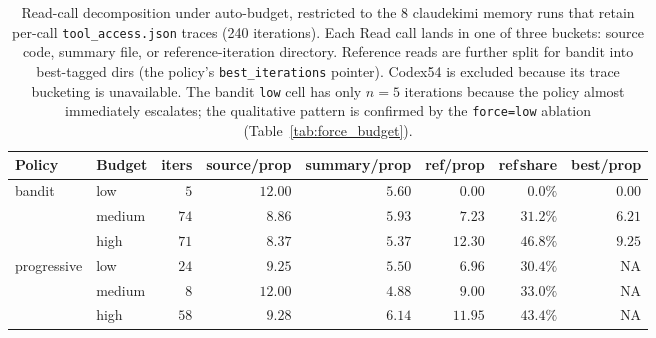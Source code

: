 \begin{table}[t]
\centering
\small
\caption{Read-call decomposition under auto-budget, restricted to the
8 claudekimi memory runs that retain per-call \texttt{tool\_access.json}
traces (240 iterations). Each Read call lands in one of three buckets:
source code, summary file, or reference-iteration directory. Reference
reads are further split for bandit into best-tagged dirs (the policy's
\texttt{best\_iterations} pointer). Codex54 is excluded because its
trace bucketing is unavailable. The bandit \texttt{low} cell has only
$n\!=\!5$ iterations because the policy almost immediately escalates;
the qualitative pattern is confirmed by the \texttt{force=low} ablation
(Table~\ref{tab:force_budget}).}
\label{tab:read_decomp}
\begin{tabular}{@{}llrrrrrr@{}}
\toprule
Policy & Budget & iters & source/prop & summary/prop & ref/prop & ref\,share & best/prop \\
\midrule
\multirow{3}{*}{bandit}      & low    & $5$  & $12.00$ & $5.60$ & $0.00$  & $0.0\%$  & $0.00$ \\
                              & medium & $74$ & $8.86$  & $5.93$ & $7.23$  & $31.2\%$ & $6.21$ \\
                              & high   & $71$ & $8.37$  & $5.37$ & $\mathbf{12.30}$ & $\mathbf{46.8\%}$ & $\mathbf{9.25}$ \\
\midrule
\multirow{3}{*}{progressive} & low    & $24$ & $9.25$  & $5.50$ & $6.96$  & $30.4\%$ & NA \\
                              & medium & $8$  & $12.00$ & $4.88$ & $9.00$  & $33.0\%$ & NA \\
                              & high   & $58$ & $9.28$  & $6.14$ & $11.95$ & $43.4\%$ & NA \\
\bottomrule
\end{tabular}
\end{table}
